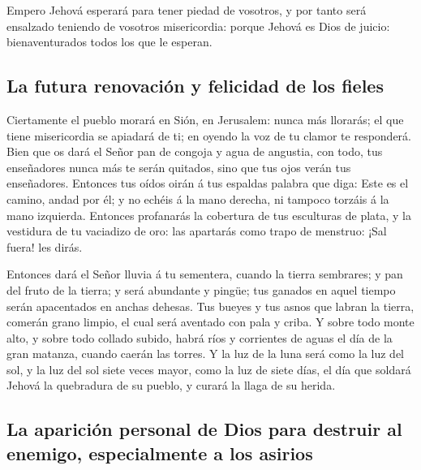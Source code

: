 Empero Jehová esperará para tener piedad de vosotros, y
por tanto será ensalzado teniendo de vosotros misericordia: porque
Jehová es Dios de juicio: bienaventurados todos los que le esperan.

\hypertarget{la-futura-renovaciuxf3n-y-felicidad-de-los-fieles}{%
\subsection{La futura renovación y felicidad de los
fieles}\label{la-futura-renovaciuxf3n-y-felicidad-de-los-fieles}}

 Ciertamente el pueblo morará en Sión, en Jerusalem:
nunca más llorarás; el que tiene misericordia se apiadará de ti; en
oyendo la voz de tu clamor te responderá.  Bien que os
dará el Señor pan de congoja y agua de angustia, con todo, tus
enseñadores nunca más te serán quitados, sino que tus ojos verán tus
enseñadores.  Entonces tus oídos oirán á tus espaldas
palabra que diga: Este es el camino, andad por él; y no echéis á la mano
derecha, ni tampoco torzáis á la mano izquierda. 
Entonces profanarás la cobertura de tus esculturas de plata, y la
vestidura de tu vaciadizo de oro: las apartarás como trapo de menstruo:
¡Sal fuera! les dirás.

 Entonces dará el Señor lluvia á tu sementera, cuando la
tierra sembrares; y pan del fruto de la tierra; y será abundante y
pingüe; tus ganados en aquel tiempo serán apacentados en anchas dehesas.
 Tus bueyes y tus asnos que labran la tierra, comerán
grano limpio, el cual será aventado con pala y criba.  Y
sobre todo monte alto, y sobre todo collado subido, habrá ríos y
corrientes de aguas el día de la gran matanza, cuando caerán las torres.
 Y la luz de la luna será como la luz del sol, y la luz
del sol siete veces mayor, como la luz de siete días, el día que soldará
Jehová la quebradura de su pueblo, y curará la llaga de su herida.

\hypertarget{la-apariciuxf3n-personal-de-dios-para-destruir-al-enemigo-especialmente-a-los-asirios}{%
\subsection{La aparición personal de Dios para destruir al enemigo,
especialmente a los
asirios}\label{la-apariciuxf3n-personal-de-dios-para-destruir-al-enemigo-especialmente-a-los-asirios}}

